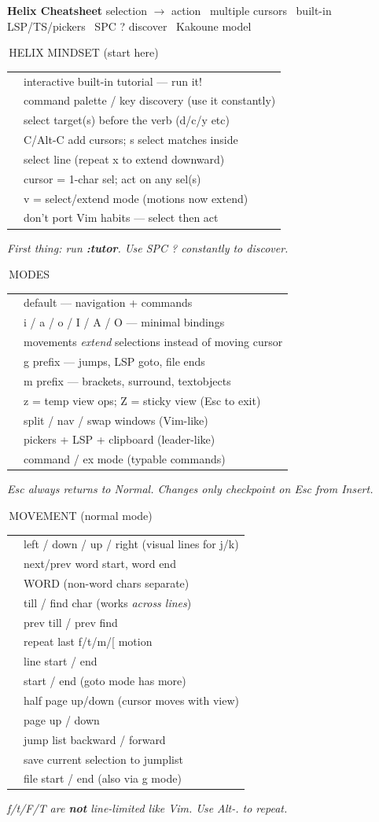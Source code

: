 \documentclass[9pt,a4paper,landscape]{extarticle}
\makeatletter
\newcommand{\kbd}[1]{{\ttfamily\bfseries\footnotesize\color{keyclr}#1}}
\newcommand{\sect}[1]{%
  \vspace{0pt}%
  {\setlength{\fboxsep}{0.5pt}%
   \noindent\colorbox{hdrbg}{\parbox{\dimexpr\columnwidth-1pt\relax}{%
     \color{hdrfg}\bfseries\sffamily\footnotesize\strut\,#1}}}%
  \par\vspace{0pt}}
\newlength{\kdsep}\setlength{\kdsep}{0pt}
\newcommand{\kd}[2]{\kbd{#1} & #2 \\[\kdsep]}
\newenvironment{kt}{%
  \setlength{\tabcolsep}{0pt}%
  \begin{tabular}{@{}>{\footnotesize\raggedright\arraybackslash}p{17mm}@{\hspace{1.5pt}}>{\footnotesize\color{bodyclr}\raggedright\arraybackslash}p{\dimexpr\columnwidth-17mm-1.5pt\relax}@{}}%
}{%
  \end{tabular}\par}
\newcommand{\snote}[1]{{\scriptsize\color{noteclr}\textit{#1}}\vspace{0pt}\par}
\makeatother
\begin{document}

{\setlength{\fboxsep}{4pt}%
 \noindent\colorbox{titlebg}{\parbox{\dimexpr\textwidth-8pt\relax}{%
   \centering\color{titlefg}%
   {\large\bfseries\sffamily Helix Cheatsheet}\enspace
   {\footnotesize\color{hdrfg}%
    selection $\rightarrow$ action \textbullet\ multiple cursors \textbullet\ built-in LSP/TS/pickers \textbullet\ SPC ? discover \textbullet\ Kakoune model}}}}
\vspace{1pt}

\begin{multicols}{5}

\sect{HELIX MINDSET (start here)}
\begin{kt}
\kd{:tutor}{interactive built-in tutorial --- run it!}
\kd{SPC ?}{command palette / key discovery (use it constantly)}
\kd{selection first}{select target(s) before the verb (d/c/y etc)}
\kd{multi-sel core}{C/Alt-C add cursors; s select matches inside}
\kd{x}{select line (repeat x to extend downward)}
\kd{think ranges}{cursor = 1-char sel; act on any sel(s)}
\kd{no visual mode}{v = select/extend mode (motions now extend)}
\kd{avoid dw etc}{don't port Vim habits --- select then act}
\end{kt}
\snote{First thing: run \kbd{:tutor}. Use SPC ? constantly to discover.}

\sect{MODES}
\begin{kt}
\kd{Normal}{default --- navigation + commands}
\kd{Insert}{i / a / o / I / A / O --- minimal bindings}
\kd{Select (v)}{movements \textit{extend} selections instead of moving cursor}
\kd{goto (g)}{g prefix --- jumps, LSP goto, file ends}
\kd{match (m)}{m prefix --- brackets, surround, textobjects}
\kd{view (z / Z)}{z = temp view ops; Z = sticky view (Esc to exit)}
\kd{window (C-w)}{split / nav / swap windows (Vim-like)}
\kd{space (SPC)}{pickers + LSP + clipboard (leader-like)}
\kd{:}{command / ex mode (typable commands)}
\end{kt}
\snote{Esc always returns to Normal. Changes only checkpoint on Esc from Insert.}

\sect{MOVEMENT (normal mode)}
\begin{kt}
\kd{h / j / k / l}{left / down / up / right (visual lines for j/k)}
\kd{w / b / e}{next/prev word start, word end}
\kd{W / B / E}{WORD (non-word chars separate)}
\kd{t\{c\} / f\{c\}}{till / find char (works \textit{across lines})}
\kd{T / F}{prev till / prev find}
\kd{Alt-.}{repeat last f/t/m/[ motion}
\kd{Home / End}{line start / end}
\kd{0 / \$}{start / end (goto mode has more)}
\kd{C-u / C-d}{half page up/down (cursor moves with view)}
\kd{C-b / C-f}{page up / down}
\kd{C-o / C-i}{jump list backward / forward}
\kd{C-s}{save current selection to jumplist}
\kd{gg / G}{file start / end (also via g mode)}
\end{kt}
\snote{f/t/F/T are \textbf{not} line-limited like Vim. Use Alt-. to repeat.}


\end{multicols}
\end{document}
